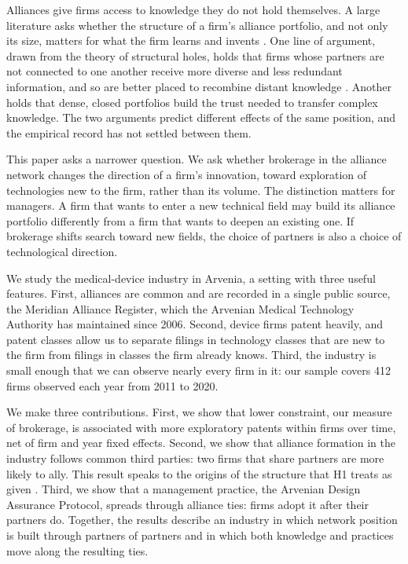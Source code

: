 \documentclass[12pt]{article}
\begin{document}
Alliances give firms access to knowledge they do not hold themselves. A large literature asks whether the structure of a firm's alliance portfolio, and not only its size, matters for what the firm learns and invents \citep{ahuja2000,stuart2000,phelps2010}. One line of argument, drawn from the theory of structural holes, holds that firms whose partners are not connected to one another receive more diverse and less redundant information, and so are better placed to recombine distant knowledge \citep{burt1992,burt2004}. Another holds that dense, closed portfolios build the trust needed to transfer complex knowledge. The two arguments predict different effects of the same position, and the empirical record has not settled between them.

This paper asks a narrower question. We ask whether brokerage in the alliance network changes the direction of a firm's innovation, toward exploration of technologies new to the firm, rather than its volume. The distinction matters for managers. A firm that wants to enter a new technical field may build its alliance portfolio differently from a firm that wants to deepen an existing one. If brokerage shifts search toward new fields, the choice of partners is also a choice of technological direction.

We study the medical-device industry in Arvenia, a setting with three useful features. First, alliances are common and are recorded in a single public source, the Meridian Alliance Register, which the Arvenian Medical Technology Authority has maintained since 2006. Second, device firms patent heavily, and patent classes allow us to separate filings in technology classes that are new to the firm from filings in classes the firm already knows. Third, the industry is small enough that we can observe nearly every firm in it: our sample covers 412 firms observed each year from 2011 to 2020.

We make three contributions. First, we show that lower constraint, our measure of brokerage, is associated with more exploratory patents within firms over time, net of firm and year fixed effects. Second, we show that alliance formation in the industry follows common third parties: two firms that share partners are more likely to ally. This result speaks to the origins of the structure that H1 treats as given \citep{zaheersoda2009,rosenkopfpadula2008}. Third, we show that a management practice, the Arvenian Design Assurance Protocol, spreads through alliance ties: firms adopt it after their partners do. Together, the results describe an industry in which network position is built through partners of partners and in which both knowledge and practices move along the resulting ties.
\end{document}
